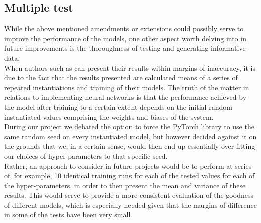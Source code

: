 \subsection{Multiple test}
While the above mentioned amendments or extensions could possibly serve to improve the performance of the models, one other aspect worth delving into in future improvements is the thoroughness of testing and generating informative data.\\
When authors such as \citeauthor{wang-et-al-2016} can present their results within margins of inaccuracy, it is due to the fact that the results presented are calculated means of a series of repeated instantiations and training of their models. The truth of the matter in relations to implementing neural networks is that the performance achieved by the model after training to a certain extent depends on the initial random instantiated values comprising the weights and biases of the system.\\
During our project we debated the option to force the PyTorch library to use the same random seed on every instantiated model, but however decided against it on the grounds that we, in a certain sense, would then end up essentially over-fitting our choices of hyper-parameters to that specific seed. \\
Rather, an approach to consider in future projects would be to perform at series of, for example, 10 identical training runs for each of the tested values for each of the hyper-parameters, in order to then present the mean and variance of these results. This would serve to provide a more consistent evaluation of the goodness of different models, which is especially needed given that the margins of difference in some of the tests have been very small.

